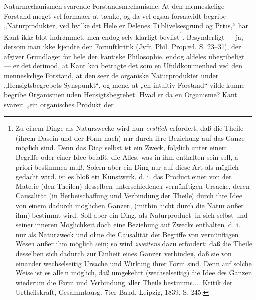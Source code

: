 \documentclass[12pt,a4paper]{book}
\begin{document}
\setcounter{footnote}{0}
Naturmechanismen svarende Forstandsmechanisme. At den menneskelige Forstand
meget vel formaaer at tænke, og da vel ogsaa forsaavidt begribe
„Naturprodukter, ved hvilke det Hele er Delenes Tilblivelsesgrund og Prius,“
har Kant ikke blot indrømmet, men endog selv klarligt beviist\footnote{Zu einem
Dinge als Naturzwecke wird nun \emph{erstlich} erfordert, daß die Theile (ihrem
Dasein und der Form nach) nur durch ihre Beziehung auf das Ganze möglich sind.
Denn das Ding selbst ist ein Zweck, folglich unter einem Begriffe oder einer
Idee befaßt, die Alles, was in ihm enthalten sein soll, a priori bestimmen muß.
Sofern aber ein Ding nur auf diese Art als möglich gedacht wird, ist es bloß
ein Kunstwerk, d. i. das Product einer von der Materie (den Theilen) desselben
unterschiedenen vernünftigen Ursache, deren Causalität (in Herbeischaffung und
Verbindung der Theile) durch ihre Idee von einem dadurch möglichen Ganzen,
(mithin nicht durch die Natur außer ihm) bestimmt wird. Soll aber ein Ding, als
Naturproduct, in sich selbst und seiner inneren Möglichkeit doch eine Beziehung
auf Zwecke enthalten, d. i. nur als Naturzweck und ohne die Causalität der
Begriffe von vernünftigen Wesen außer ihm möglich sein; so wird
\emph{zweitens} dazu erfordert: daß die Theile desselben sich dadurch zur
Einheit eines Ganzen verbinden, daß sie von einander wechselseitig Ursache und
Wirkung ihrer Form sind. Denn auf solche Weise ist es allein möglich, daß
umgekehrt (wechselseitig) die Idee des Ganzen wiederum die Form und Verbindung
aller Theile bestimme.... Kritik der Urtheilskraft, Gesammtausg. 7ter Band.
Leipzig, 1839. S. 245.}. Besynderligt --- ja, dersom man ikke kjendte den
Fornuftkritik (Jvfr. Phil. Propæd. S. 23--31), der afgiver Grundlaget for hele
den kantiske Philosophie, endog aldeles ubegribeligt --- er det derimod, at
Kant kan betragte det som en Ufuldkommenhed ved den menneskelige Forstand, at
den seer de organiske Naturprodukter under „Hensigtsbegrebets Synspunkt“, og
mene, at „en intuitiv Forstand“ vilde kunne begribe Organismen uden
Hensigtsbegrebet. Hvad er da en Organisme? Kant svarer: „ein organisches
Produkt der
\end{document}
